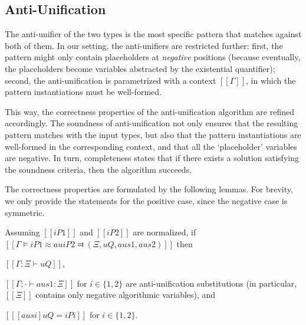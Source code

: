         

\subsection{Anti-Unification}

The anti-unifier of the two types is the most specific pattern that matches against both of them. 
In our setting, the anti-unifiers are restricted further: first, the pattern might only contain placeholders at 
\emph{negative} positions (because eventually, the placeholders become variables abstracted by the existential quantifier);
second, the anti-unification is parametrized with a context $[[Γ]]$, in which the pattern instantiations must be well-formed.

This way, the correctness properties of the anti-unification algorithm are refined accordingly.
The soundness of anti-unification not only ensures that the resulting pattern matches with 
the input types, but also that the pattern instantiations are well-formed in the corresponding context, and 
that all the `placeholder' variables are negative. In turn, completeness states that if there exists a solution 
satisfying the soundness criteria, then the algorithm succeeds.

The correctness properties are formulated by the following lemmas. For brevity, we only provide the statements for 
the positive case, since the negative case is symmetric.

\begin{lemma*}
    \label{lemma:au-soundness}
     Assuming $[[iP1]]$ and $[[iP2]]$ are normalized,
    if $[[Γ ⊨ iP1 ≈au iP2 ⫤ (Ξ, uQ, aus1, aus2)]]$
    then 
    \begin{enumerate*}
        \item $[[Γ ; Ξ ⊢ uQ]]$,
        \item $[[Γ ; · ⊢ aus1 : Ξ]]$ for $i \in \{1,2\}$
        are anti-unification substitutions (in particular, $[[Ξ]]$ contains only negative algorithmic variables), and
        \item $[[ [ausi] uQ = iPi ]]$ for $i \in \{1,2\}$.
    \end{enumerate*}
\end{lemma*}

